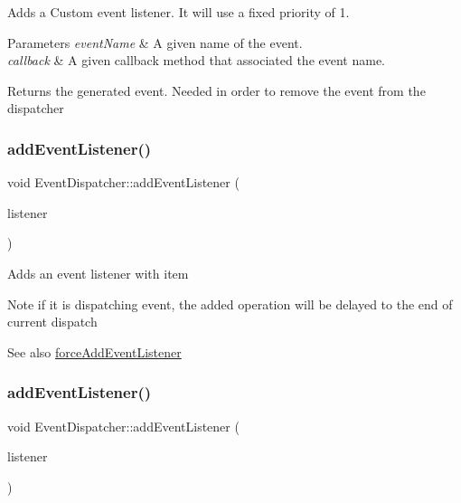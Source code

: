 Adds a Custom event listener. It will use a fixed priority of 1. 
\begin{DoxyParams}{Parameters}
{\em event\+Name} & A given name of the event. \\
\hline
{\em callback} & A given callback method that associated the event name. \\
\hline
\end{DoxyParams}
\begin{DoxyReturn}{Returns}
the generated event. Needed in order to remove the event from the dispatcher 
\end{DoxyReturn}
\mbox{\label{classEventDispatcher_aacb9cc74f76d66952e749f2cc1519444}} 
\subsubsection{\texorpdfstring{add\+Event\+Listener()}{addEventListener()}\hspace{0.1cm}{\footnotesize\ttfamily [1/2]}}
{\footnotesize\ttfamily void Event\+Dispatcher\+::add\+Event\+Listener (\begin{DoxyParamCaption}\item[{\hyperlink{classEventListener}{Event\+Listener} $\ast$}]{listener }\end{DoxyParamCaption})\hspace{0.3cm}{\ttfamily [protected]}}

Adds an event listener with item \begin{DoxyNote}{Note}
if it is dispatching event, the added operation will be delayed to the end of current dispatch 
\end{DoxyNote}
\begin{DoxySeeAlso}{See also}
\hyperlink{classEventDispatcher_aaf736dd2a383a114e59be39e967fb0f3}{force\+Add\+Event\+Listener} 
\end{DoxySeeAlso}
\mbox{\label{classEventDispatcher_aacb9cc74f76d66952e749f2cc1519444}} 
\subsubsection{\texorpdfstring{add\+Event\+Listener()}{addEventListener()}\hspace{0.1cm}{\footnotesize\ttfamily [2/2]}}
{\footnotesize\ttfamily void Event\+Dispatcher\+::add\+Event\+Listener (\begin{DoxyParamCaption}\item[{\hyperlink{classEventListener}{Event\+Listener} $\ast$}]{listener }\end{DoxyParamCaption})\hspace{0.3cm}{\ttfamily [protected]}}

